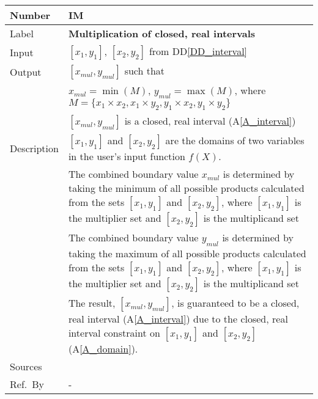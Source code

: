 \documentclass[12pt]{article}
\newcommand{\colAwidth}{0.13\textwidth}
\newcommand{\colBwidth}{0.82\textwidth}
\newcommand{\ddref}[1]{DD\ref{#1}}
\newcommand{\aref}[1]{A\ref{#1}}
\newcounter{instnum} %
\begin{document}
\noindent
\begin{minipage}{\textwidth}
	\renewcommand*{\arraystretch}{1.5}
	\begin{tabular}{| p{\colAwidth} | p{\colBwidth}|}
		\hline
		\rowcolor[gray]{0.9}
		Number& IM{instnum}\theinstnum \label{I_multiplication}\\
		\hline
		Label& \bf Multiplication of closed, real intervals\\
		\hline
		Input&$[x_{1}, y_{1}]$, $[x_{2}, y_{2}]$ from \ddref{DD_interval}\\
		\hline
		Output&$[x_{mul}, y_{mul}]$ such that\\
		&$x_{mul} = \min(M)$, $y_{mul} = \max(M)$, where $M = \{x_{1} \times 
		x_{2}, x_{1} \times y_{2}, y_{1} \times x_{2}, y_{1} \times y_{2}\}$\\
		&$[x_{mul}, y_{mul}]$ is a closed, real interval (\aref{A_interval}) \\
		\hline
		Description&$[x_{1}, y_{1}]$ and $[x_{2}, y_{2}]$ are the domains of 
		two variables in the user's input function $f(X)$. \\
		&The combined boundary value $x_{mul}$ is determined by taking the 
		minimum of all possible products calculated from the sets $[x_{1}, 
		y_{1}]$ and $[x_{2}, y_{2}]$, where $[x_{1}, y_{1}]$ is the 
		multiplier set and $[x_{2}, y_{2}]$ is the multiplicand set\\
		&The combined boundary value $y_{mul}$ is determined by taking the 
		maximum of all possible products calculated from the sets $[x_{1}, 
		y_{1}]$ and $[x_{2}, y_{2}]$, where $[x_{1}, y_{1}]$ is the 
		multiplier set and $[x_{2}, y_{2}]$ is the multiplicand set\\
		& The result, $[x_{mul}, y_{mul}]$, is guaranteed to be a closed, real 
		interval (\aref{A_interval}) due to the closed, real interval 
		constraint on $[x_{1}, y_{1}]$ and $[x_{2}, y_{2}]$ (\aref{A_domain}).
		\\
		\hline
		Sources& ~\cite{intervalarithmetic} \ \\
		\hline
		Ref.\ By & -\\
		\hline
	\end{tabular}
\end{minipage}\\

~\newline
\end{document}

